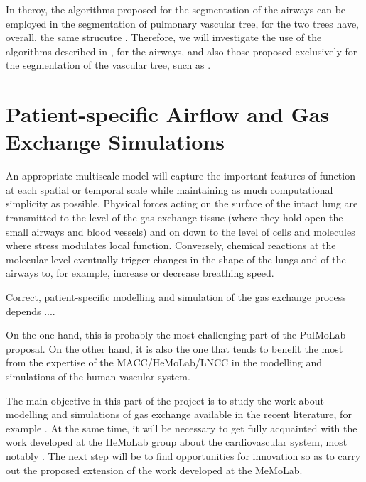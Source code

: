 \approach

In theroy, the algorithms proposed for the segmentation of the airways can be employed in the segmentation of pulmonary vascular tree, for the two trees have, overall, the same strucutre \citep{TawhaiM2011}. Therefore, we will investigate the use of the algorithms described in \citep{Lo}, for the airways, and also those proposed exclusively for the segmentation of the vascular tree, such as \citep{Dongen,Ebrahimdoost,Gutierrez,Linguraru,Shikata,Wala}.


\section{Patient-specific Airflow and Gas Exchange Simulations}

\challenge

An appropriate multiscale model will capture the important features of function at each spatial or temporal scale while maintaining as much computational simplicity as possible. Physical forces acting on the surface of the intact lung are transmitted to the level of the gas exchange tissue (where they hold open the small airways and blood vessels) and on down to the level of cells and molecules where stress modulates local function. Conversely, chemical reactions at the molecular level eventually trigger changes in the shape of the lungs and of the airways to, for example, increase or decrease breathing speed.

Correct, patient-specific modelling and simulation of the gas exchange process depends ....

On the one hand, this is probably the most challenging part of the PulMoLab proposal. On the other hand, it is also the one that tends to benefit the most from the expertise of the MACC/HeMoLab/LNCC in the modelling and simulations of the human vascular system. 

\approach

The main objective in this part of the project is to study the work about modelling and simulations of gas exchange available in the recent literature, for example \citep{TawhaiM2011,Tawhai2010,Tawhai08,Burrowes2005,Lin2009,Werner2009,DeBacker2008,DeBacker2010,Gemci2007}. At the same time, it will be necessary to get fully acquainted with the work developed at the HeMoLab group about the cardiovascular system, most notably \citep{Blanco2007,Blanco2009a,Blanco2010,Blanco2012,Urquiza2006}. The next step will be to find opportunities for innovation so as to carry out the proposed extension of the work developed at the MeMoLab.

